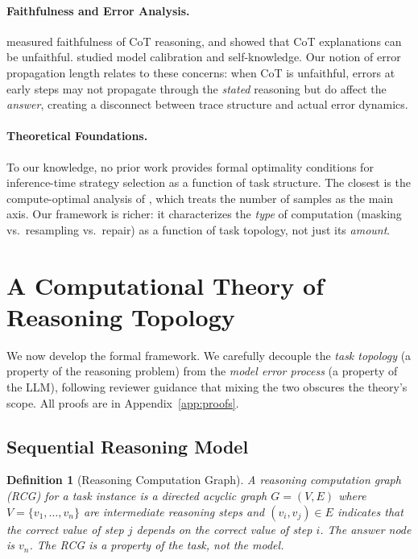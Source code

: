 \documentclass{article}
\newtheorem{definition}{Definition}
\begin{document}
\paragraph{Faithfulness and Error Analysis.}
\citet{lanham2023measuring} measured faithfulness of CoT reasoning, and \citet{turpin2024language} showed that CoT explanations can be unfaithful. \citet{kadavath2022language} studied model calibration and self-knowledge. Our notion of error propagation length relates to these concerns: when CoT is unfaithful, errors at early steps may not propagate through the \emph{stated} reasoning but do affect the \emph{answer}, creating a disconnect between trace structure and actual error dynamics.

\paragraph{Theoretical Foundations.}
To our knowledge, no prior work provides formal optimality conditions for inference-time strategy selection as a function of task structure. The closest is the compute-optimal analysis of \citet{snell2024scaling}, which treats the number of samples as the main axis. Our framework is richer: it characterizes the \emph{type} of computation (masking vs.\ resampling vs.\ repair) as a function of task topology, not just its \emph{amount}.

\section{A Computational Theory of Reasoning Topology}
\label{sec:theory}

We now develop the formal framework. We carefully decouple the \emph{task topology} (a property of the reasoning problem) from the \emph{model error process} (a property of the LLM), following reviewer guidance that mixing the two obscures the theory's scope. All proofs are in Appendix~\ref{app:proofs}.

\subsection{Sequential Reasoning Model}

\begin{definition}[Reasoning Computation Graph]
\label{def:rcg}
A \emph{reasoning computation graph} (RCG) for a task instance is a directed acyclic graph $G = (V, E)$ where $V = \{v_1, \ldots, v_n\}$ are intermediate reasoning steps and $(v_i, v_j) \in E$ indicates that the correct value of step $j$ depends on the correct value of step $i$. The answer node is $v_n$. The RCG is a property of the \emph{task}, not the model.
\end{definition}
\end{document}
